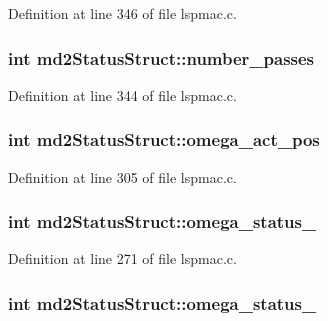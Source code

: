 Definition at line 346 of file lspmac.\-c.

\hypertarget{structmd2StatusStruct_ab3da523bad7b82c1d27780caa24a8b92}{
\subsubsection[{number\-\_\-passes}]{\setlength{\rightskip}{0pt plus 5cm}int md2\-Status\-Struct\-::number\-\_\-passes}}\label{structmd2StatusStruct_ab3da523bad7b82c1d27780caa24a8b92}


Definition at line 344 of file lspmac.\-c.

\hypertarget{structmd2StatusStruct_a6ce303bec89082cae1e9b1fddf6b6c10}{
\subsubsection[{omega\-\_\-act\-\_\-pos}]{\setlength{\rightskip}{0pt plus 5cm}int md2\-Status\-Struct\-::omega\-\_\-act\-\_\-pos}}\label{structmd2StatusStruct_a6ce303bec89082cae1e9b1fddf6b6c10}


Definition at line 305 of file lspmac.\-c.

\hypertarget{structmd2StatusStruct_af6cf3cd65b9ef205685a0d970f168907}{
\subsubsection[{omega\-\_\-status\-\_\-1}]{\setlength{\rightskip}{0pt plus 5cm}int md2\-Status\-Struct\-::omega\-\_\-status\-\_}}\label{structmd2StatusStruct_af6cf3cd65b9ef205685a0d970f168907}


Definition at line 271 of file lspmac.\-c.

\hypertarget{structmd2StatusStruct_a8577c9df7b663b548b2759ac3db721cd}{
\subsubsection[{omega\-\_\-status\-\_\-2}]{\setlength{\rightskip}{0pt plus 5cm}int md2\-Status\-Struct\-::omega\-\_\-status\-\_}}\label{structmd2StatusStruct_a8577c9df7b663b548b2759ac3db721cd}


